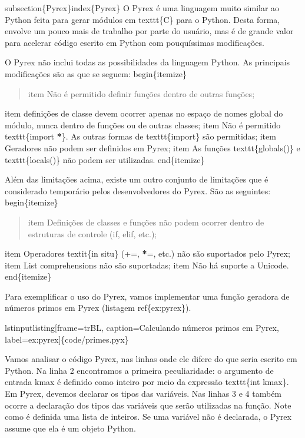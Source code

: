 \documentclass[a4paper,10pt,portuguese]{sphinxmanual}
\begin{document}
subsection\{Pyrex\}index\{Pyrex\}
O Pyrex é uma linguagem muito similar ao Python feita para gerar módulos em texttt\{C\} para o Python.
Desta forma, envolve um pouco mais de trabalho por parte do usuário, mas é de grande valor para acelerar código escrito em Python com pouquíssimas modificações.

O Pyrex não inclui todas as possibilidades da linguagem Python. As principais modificações são as que se seguem:
begin\{itemize\}
\begin{quote}

item Não é permitido definir funções dentro de outras funções;
\end{quote}

item definições de classe devem ocorrer apenas no espaço de nomes global do módulo, nunca dentro de funções ou de outras classes;
item Não é permitido texttt\{import {\color{red}\bfseries{}*}\}. As outras formas de texttt\{import\} são permitidas;
item Geradores não podem ser definidos em Pyrex;
item As funções texttt\{globals()\} e texttt\{locals()\} não podem ser utilizadas.
end\{itemize\}

Além das limitações acima, existe um outro conjunto de limitações que é considerado temporário pelos desenvolvedores do Pyrex. São as seguintes:
begin\{itemize\}
\begin{quote}

item Definições de classes e funções não podem ocorrer dentro de estruturas de controle (if, elif, etc.);
\end{quote}

item Operadores textit\{in situ\} (+=, {\color{red}\bfseries{}*}=, etc.) não são suportados pelo Pyrex;
item List comprehensions não são suportadas;
item Não há suporte a Unicode.
end\{itemize\}

Para exemplificar o uso do Pyrex, vamos implementar uma função geradora de números primos em Pyrex (listagem ref\{ex:pyrex\}).

lstinputlisting{[}frame=trBL, caption=Calculando números primos em Pyrex, label=ex:pyrex{]}\{code/primes.pyx\}

Vamos analisar o código Pyrex, nas linhas onde ele difere do que seria escrito em Python. Na linha 2 encontramos a primeira peculiaridade: o argumento de entrada kmax é definido como inteiro por meio da expressão texttt\{int kmax\}. Em Pyrex, devemos declarar os tipos das variáveis. Nas linhas 3 e 4 também ocorre a declaração dos tipos das variáveis que serão utilizadas na função. Note como é definida uma lista de inteiros. Se uma variável não é declarada, o Pyrex assume que ela é um objeto Python.
\end{document}

